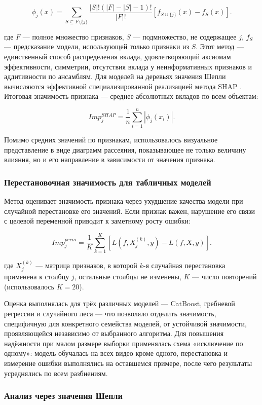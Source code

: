 \documentclass[times]{itmo-student-thesis}
\begin{document}
\[
\phi_j(x)=\sum_{S\subseteq F\setminus\{j\}}\frac{|S|!(|F|-|S|-1)!}{|F|!}\left[f_{S\cup\{j\}}(x)-f_S(x)\right].
\]

где $F$ — полное множество признаков, $S$ — подмножество, не содержащее $j$, $f_S$ — предсказание модели, использующей только признаки из $S$. Этот метод — единственный способ распределения вклада, удовлетворяющий аксиомам эффективности, симметрии, отсутствия вклада у неинформативных признаков и аддитивности по ансамблям. Для моделей на деревьях значения Шепли вычисляются эффективной специализированной реализацией метода SHAP \cite{lundberg2017shap}. Итоговая значимость признака — среднее абсолютных вкладов по всем объектам:

\[
Imp_j^{SHAP}=\frac{1}{n}\sum_{i=1}^{n}|\phi_j(x_i)|.
\]

Помимо средних значений по признакам, использовалось визуальное представление в виде диаграмм рассеяния, показывающее не только величину влияния, но и его направление в зависимости от значения признака.

\subsubsection{Перестановочная значимость для табличных моделей}

Метод оценивает значимость признака через ухудшение качества модели при случайной перестановке его значений. Если признак важен, нарушение его связи с целевой переменной приводит к заметному росту ошибки:

\[
Imp_j^{perm}=\frac{1}{K}\sum_{k=1}^{K}\left[L(f,X_j^{(k)},y)-L(f,X,y)\right].
\]

где $X_j^{(k)}$ — матрица признаков, в которой $k$-я случайная перестановка применена к столбцу $j$, остальные столбцы не изменены, $K$ — число повторений (использовалось $K=20$).

Оценка выполнялась для трёх различных моделей — CatBoost, гребневой регрессии и случайного леса — что позволяло отделить значимость, специфичную для конкретного семейства моделей, от устойчивой значимости, проявляющейся независимо от выбранного алгоритма. Для повышения надёжности при малом размере выборки применялась схема «исключение по одному»: модель обучалась на всех видео кроме одного, перестановка и измерение ошибки выполнялись на оставшемся примере, после чего результаты усреднялись по всем разбиениям.

\subsubsection{Анализ через значения Шепли}
\end{document}
